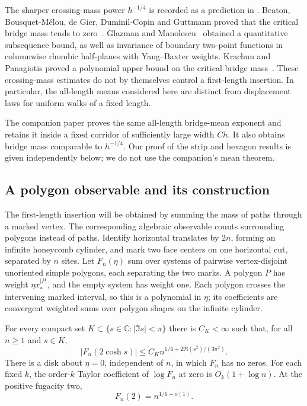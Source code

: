 The sharper crossing-mass power $h^{-1/4}$ is recorded as a prediction
in \cite[Section~4]{DuminilCopinSmirnov2012}. Beaton, Bousquet-M\'elou,
de Gier, Duminil-Copin and Guttmann proved that the critical bridge
mass tends to zero~\cite{BeatonEtAl2014}. Glazman and
Manolescu~\cite{GlazmanManolescu2017} obtained a quantitative subsequence
bound, as well as invariance of boundary two-point functions in
columnwise rhombic half-planes with Yang--Baxter weights. Krachun and
Panagiotis proved a polynomial upper bound on the critical bridge
mass~\cite{KrachunPanagiotis2026}. These crossing-mass estimates do not
by themselves control a first-length insertion. In particular, the
all-length means considered here are distinct from displacement laws
for uniform walks of a fixed length.

The companion paper \cite[Theorem~1.1]{DiskTransfer2026} proves the same
all-length bridge-mean exponent and retains it inside a fixed corridor
of sufficiently large width $Ch$. It also obtains bridge mass
comparable to $h^{-1/4}$. Our proof of the strip and hexagon results is
given independently below; we do not use the companion's mean theorem.

\subsection{A polygon observable and its construction}

The first-length insertion will be obtained by summing the mass of paths
through a marked vertex. The corresponding algebraic observable counts
surrounding polygons instead of paths. Identify horizontal translates by
$2n$, forming an infinite honeycomb cylinder, and mark two face centers
on one horizontal cut, separated by $n$ sites. Let $F_n(\eta)$ sum over
systems of pairwise vertex-disjoint unoriented simple polygons, each
separating the two marks. A polygon $P$ has weight $\eta x_*^{|P|}$, and
the empty system has weight one. Each polygon crosses the intervening
marked interval, so this is a polynomial in $\eta$; its coefficients are
convergent weighted sums over polygon shapes on the infinite cylinder.

\begin{theorem}\label{thm:pv:puncture}
For every compact set $K\subset\{s\in\mathbb C:|\Im s|<\pi\}$ there
is $C_K<\infty$ such that, for all $n\ge1$ and $s\in K$,
\[
 |F_n(2\cosh s)|\le
 C_K n^{1/6+2\Re(s^2)/(3\pi^2)}.
\]
There is a disk about $\eta=0$, independent of $n$, in which $F_n$ has
no zeros. For each fixed $k$, the order-$k$ Taylor coefficient of
$\log F_n$ at zero is $O_k(1+\log n)$. At the positive fugacity two,
\[
 F_n(2)=n^{1/6+o(1)}.
\]
\end{theorem}

